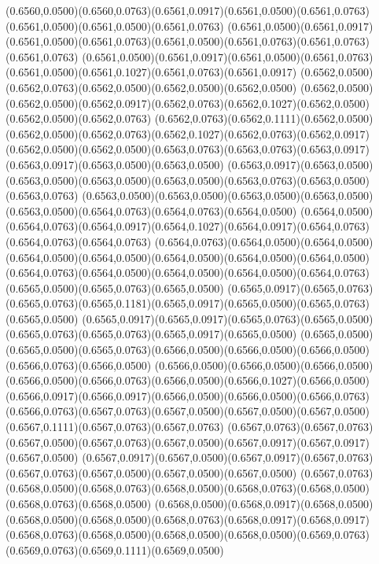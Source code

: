 (0.6560,0.0500)(0.6560,0.0763)(0.6561,0.0917)(0.6561,0.0500)(0.6561,0.0763)(0.6561,0.0500)(0.6561,0.0500)(0.6561,0.0763)
(0.6561,0.0500)(0.6561,0.0917)(0.6561,0.0500)(0.6561,0.0763)(0.6561,0.0500)(0.6561,0.0763)(0.6561,0.0763)(0.6561,0.0763)
(0.6561,0.0500)(0.6561,0.0917)(0.6561,0.0500)(0.6561,0.0763)(0.6561,0.0500)(0.6561,0.1027)(0.6561,0.0763)(0.6561,0.0917)
(0.6562,0.0500)(0.6562,0.0763)(0.6562,0.0500)(0.6562,0.0500)(0.6562,0.0500)
\PST@Solid(0.6562,0.0500)(0.6562,0.0500)(0.6562,0.0917)(0.6562,0.0763)(0.6562,0.1027)(0.6562,0.0500)(0.6562,0.0500)(0.6562,0.0763)
(0.6562,0.0763)(0.6562,0.1111)(0.6562,0.0500)(0.6562,0.0500)(0.6562,0.0763)(0.6562,0.1027)(0.6562,0.0763)(0.6562,0.0917)
(0.6562,0.0500)(0.6562,0.0500)(0.6563,0.0763)(0.6563,0.0763)(0.6563,0.0917)(0.6563,0.0917)(0.6563,0.0500)(0.6563,0.0500)
(0.6563,0.0917)(0.6563,0.0500)(0.6563,0.0500)(0.6563,0.0500)(0.6563,0.0500)(0.6563,0.0763)(0.6563,0.0500)(0.6563,0.0763)
(0.6563,0.0500)(0.6563,0.0500)(0.6563,0.0500)(0.6563,0.0500)(0.6563,0.0500)(0.6564,0.0763)(0.6564,0.0763)(0.6564,0.0500)
(0.6564,0.0500)(0.6564,0.0763)(0.6564,0.0917)(0.6564,0.1027)(0.6564,0.0917)(0.6564,0.0763)(0.6564,0.0763)(0.6564,0.0763)
(0.6564,0.0763)(0.6564,0.0500)(0.6564,0.0500)(0.6564,0.0500)(0.6564,0.0500)(0.6564,0.0500)(0.6564,0.0500)(0.6564,0.0500)
(0.6564,0.0763)(0.6564,0.0500)(0.6564,0.0500)(0.6564,0.0500)(0.6564,0.0763)(0.6565,0.0500)(0.6565,0.0763)(0.6565,0.0500)
(0.6565,0.0917)(0.6565,0.0763)(0.6565,0.0763)(0.6565,0.1181)(0.6565,0.0917)(0.6565,0.0500)(0.6565,0.0763)(0.6565,0.0500)
(0.6565,0.0917)(0.6565,0.0917)(0.6565,0.0763)(0.6565,0.0500)(0.6565,0.0763)(0.6565,0.0763)(0.6565,0.0917)(0.6565,0.0500)
(0.6565,0.0500)(0.6565,0.0500)(0.6565,0.0763)(0.6566,0.0500)(0.6566,0.0500)(0.6566,0.0500)(0.6566,0.0763)(0.6566,0.0500)
(0.6566,0.0500)(0.6566,0.0500)(0.6566,0.0500)(0.6566,0.0500)(0.6566,0.0763)(0.6566,0.0500)(0.6566,0.1027)(0.6566,0.0500)
(0.6566,0.0917)(0.6566,0.0917)(0.6566,0.0500)(0.6566,0.0500)(0.6566,0.0763)
\PST@Solid(0.6566,0.0763)(0.6567,0.0763)(0.6567,0.0500)(0.6567,0.0500)(0.6567,0.0500)(0.6567,0.1111)(0.6567,0.0763)(0.6567,0.0763)
(0.6567,0.0763)(0.6567,0.0763)(0.6567,0.0500)(0.6567,0.0763)(0.6567,0.0500)(0.6567,0.0917)(0.6567,0.0917)(0.6567,0.0500)
(0.6567,0.0917)(0.6567,0.0500)(0.6567,0.0917)(0.6567,0.0763)(0.6567,0.0763)(0.6567,0.0500)(0.6567,0.0500)(0.6567,0.0500)
(0.6567,0.0763)(0.6568,0.0500)(0.6568,0.0763)(0.6568,0.0500)(0.6568,0.0763)(0.6568,0.0500)(0.6568,0.0763)(0.6568,0.0500)
(0.6568,0.0500)(0.6568,0.0917)(0.6568,0.0500)(0.6568,0.0500)(0.6568,0.0500)(0.6568,0.0763)(0.6568,0.0917)(0.6568,0.0917)
(0.6568,0.0763)(0.6568,0.0500)(0.6568,0.0500)(0.6568,0.0500)(0.6569,0.0763)(0.6569,0.0763)(0.6569,0.1111)(0.6569,0.0500)
